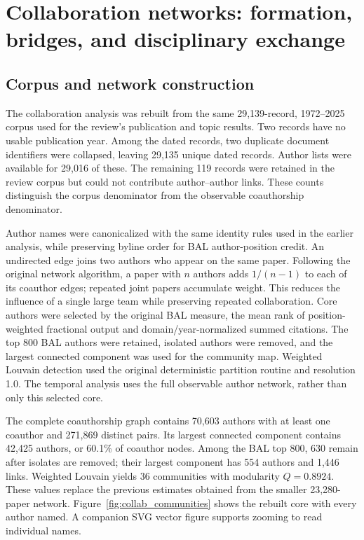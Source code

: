 \section{Collaboration networks: formation, bridges, and disciplinary exchange}
\label{sec:collaboration}

\subsection{Corpus and network construction}

The collaboration analysis was rebuilt from the same 29,139-record, 1972--2025 corpus used for the review's publication and topic results. Two records have no usable publication year. Among the dated records, two duplicate document identifiers were collapsed, leaving 29,135 unique dated records. Author lists were available for 29,016 of these. The remaining 119 records were retained in the review corpus but could not contribute author--author links. These counts distinguish the corpus denominator from the observable coauthorship denominator.

Author names were canonicalized with the same identity rules used in the earlier analysis, while preserving byline order for BAL author-position credit. An undirected edge joins two authors who appear on the same paper. Following the original network algorithm, a paper with $n$ authors adds $1/(n-1)$ to each of its coauthor edges; repeated joint papers accumulate weight. This reduces the influence of a single large team while preserving repeated collaboration. Core authors were selected by the original BAL measure, the mean rank of position-weighted fractional output and domain/year-normalized summed citations. The top 800 BAL authors were retained, isolated authors were removed, and the largest connected component was used for the community map. Weighted Louvain detection used the original deterministic partition routine and resolution 1.0. The temporal analysis uses the full observable author network, rather than only this selected core.

The complete coauthorship graph contains 70,603 authors with at least one coauthor and 271,869 distinct pairs. Its largest connected component contains 42,425 authors, or 60.1\% of coauthor nodes. Among the BAL top 800, 630 remain after isolates are removed; their largest component has 554 authors and 1,446 links. Weighted Louvain yields 36 communities with modularity $Q=0.8924$. These values replace the previous estimates obtained from the smaller 23,280-paper network. Figure~\ref{fig:collab_communities} shows the rebuilt core with every author named. A companion SVG vector figure supports zooming to read individual names.

